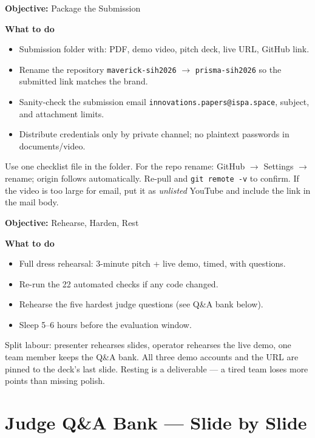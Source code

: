 \documentclass[11pt,a4paper]{article}
\newcommand{\code}[1]{\texttt{\small #1}}
\newcommand{\solution}[1]{\par\vspace{0.4em}\noindent
  \begin{tcolorbox}[colback=solgreen!8,colframe=solgreen,
    title={\sffamily\bfseries\color{white}The Solution},arc=2pt,boxrule=1pt] #1 \end{tcolorbox}\par\vspace{0.6em}}
\newcommand{\phasebox}[3]{\par\vspace{0.8em}\noindent
  \begin{tcolorbox}[colback=isroblue!6,colframe=isroblue,
    title={\sffamily\bfseries\color{white}#1 \quad (#2)},arc=2pt,boxrule=1.2pt]
    \textbf{Objective:} #3%
  \end{tcolorbox}\par\vspace{0.4em}}
\begin{document}
\phasebox{Phase 5}{Hours 13--16}{Package the Submission}

\textbf{What to do}
\begin{itemize}[leftmargin=1.5em]
  \item Submission folder with: PDF, demo video, pitch deck, live URL, GitHub link.
  \item Rename the repository \code{maverick-sih2026} $\rightarrow$ \code{prisma-sih2026}
        so the submitted link matches the brand.
  \item Sanity-check the submission email \texttt{innovations.papers@ispa.space},
        subject, and attachment limits.
  \item Distribute credentials only by private channel; no plaintext passwords in
        documents/video.
\end{itemize}

\solution{
  Use one checklist file in the folder. For the repo rename: GitHub $\rightarrow$ Settings
  $\rightarrow$ rename; origin follows automatically. Re-pull and \code{git remote -v} to
  confirm. If the video is too large for email, put it as \emph{unlisted} YouTube and
  include the link in the mail body.
}

\phasebox{Phase 6}{Hours 16--24}{Rehearse, Harden, Rest}

\textbf{What to do}
\begin{itemize}[leftmargin=1.5em]
  \item Full dress rehearsal: 3-minute pitch + live demo, timed, with questions.
  \item Re-run the 22 automated checks if any code changed.
  \item Rehearse the five hardest judge questions (see Q\&A bank below).
  \item Sleep 5--6 hours before the evaluation window.
\end{itemize}

\solution{
  Split labour: presenter rehearses slides, operator rehearses the live demo, one team member
  keeps the Q\&A bank. All three demo accounts and the URL are pinned to the deck's last
  slide. Resting is a deliverable --- a tired team loses more points than missing polish.
}

\section{Judge Q\&A Bank --- Slide by Slide}
\label{sec:qa}
\end{document}
